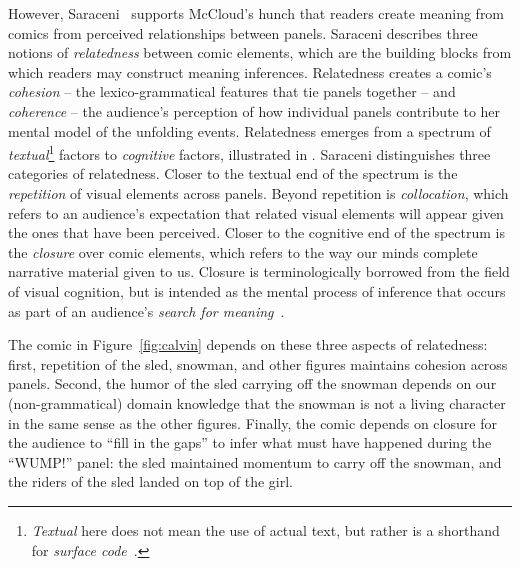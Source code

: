 However, Saraceni~\cite{saraceni2016relatedness} supports
McCloud's hunch that readers create meaning from comics from perceived
relationships between panels.  Saraceni describes three notions of
\emph{relatedness} between comic elements, which are the building blocks
from which readers may construct meaning inferences.  
Relatedness creates  a comic's \emph{cohesion} -- the lexico-grammatical
features that tie panels together -- and \emph{coherence} -- the audience's
perception of how individual panels contribute to her mental model of the
unfolding events. Relatedness emerges from a spectrum of
\emph{textual}\footnote{\emph{Textual} here does not mean the use of actual
text, but rather is a shorthand for \emph{surface
code}~\cite{zwaan1998situation}.} factors to \emph{cognitive} factors,
illustrated in .
%
Saraceni distinguishes three categories of relatedness.  Closer to the
textual end of the spectrum is the \emph{repetition} of visual elements
across panels. Beyond repetition is \emph{collocation}, which refers to an
audience's expectation that related visual elements will appear given the
ones that have been perceived. Closer to the cognitive end of the spectrum
is the \emph{closure} over comic elements, which refers to the way our
minds complete narrative material given to us. Closure is terminologically
borrowed from the field of visual cognition, but is intended as the mental
process of inference that occurs as part of an audience's \emph{search for
meaning}~\cite{gerrig1994readers}.

%
The comic in Figure~\ref{fig:calvin} depends on these three 
aspects of relatedness: first, repetition of the sled, snowman, and other
figures maintains cohesion across panels. Second, the humor of the sled
carrying off the snowman depends on our (non-grammatical) domain knowledge
that the snowman is not a living character in the same sense as the other
figures. Finally, the comic depends on closure for the audience to ``fill
in the gaps'' to infer what must have happened during the ``WUMP!'' panel:
the sled maintained momentum to carry off the snowman, and the riders of
the sled landed on top of the girl.

